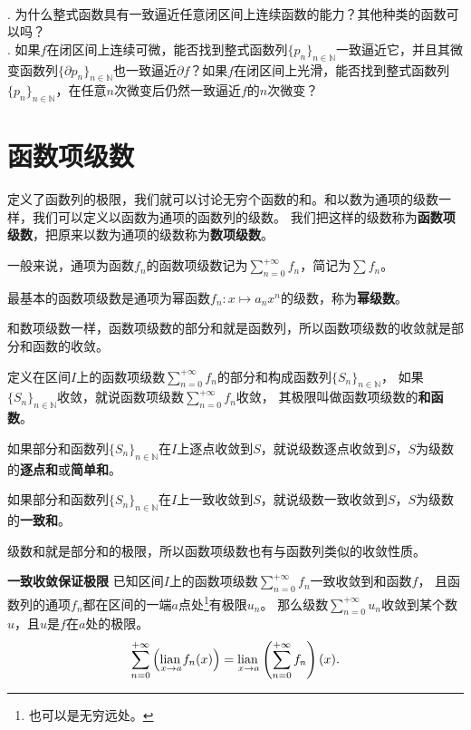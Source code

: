 \documentclass[12pt,UTF8]{ctexbook}
\begin{document}
\begin{sk}
    \mbox{} \\
    . 为什么整式函数具有一致逼近任意闭区间上连续函数的能力？其他种类的函数可以吗？\\
    . 如果$f$在闭区间上连续可微，能否找到整式函数列$\{p_n\}_{n\in\mathbb{N}}$一致逼近它，并且其微变函数列$\{\partial p_n\}_{n\in\mathbb{N}}$也一致逼近$\partial f$？如果$f$在闭区间上光滑，能否找到整式函数列$\{p_n\}_{n\in\mathbb{N}}$，在任意$n$次微变后仍然一致逼近$f$的$n$次微变？
\end{sk}

\section{函数项级数}

定义了函数列的极限，我们就可以讨论无穷个函数的和。和以数为通项的级数一样，我们可以定义以函数为通项的函数列的级数。
我们把这样的级数称为\textbf{函数项级数}，把原来以数为通项的级数称为\textbf{数项级数}。

一般来说，通项为函数$f_n$的函数项级数记为$\sum_{n=0}^{+\infty} f_n$，简记为$\sum f_n$。

最基本的函数项级数是通项为幂函数$f_n: x\mapsto a_n x^n$的级数，称为\textbf{幂级数}。

和数项级数一样，函数项级数的部分和就是函数列，所以函数项级数的收敛就是部分和函数的收敛。

定义在区间$I$上的函数项级数$\sum_{n=0}^{+\infty} f_n$的部分和构成函数列$\{S_n\}_{n\in\mathbb{N}}$，
如果$\{S_n\}_{n\in\mathbb{N}}$收敛，就说函数项级数$\sum_{n=0}^{+\infty} f_n$收敛，
其极限叫做函数项级数的\textbf{和函数}。

如果部分和函数列$\{S_n\}_{n\in\mathbb{N}}$在$I$上逐点收敛到$S$，就说级数逐点收敛到$S$，$S$为级数的\textbf{逐点和}或\textbf{简单和}。

如果部分和函数列$\{S_n\}_{n\in\mathbb{N}}$在$I$上一致收敛到$S$，就说级数一致收敛到$S$，$S$为级数的\textbf{一致和}。

级数和就是部分和的极限，所以函数项级数也有与函数列类似的收敛性质。

\begin{tm}{\textbf{一致收敛保证极限}}
    已知区间$I$上的函数项级数$\sum_{n=0}^{+\infty} f_n$一致收敛到和函数$f$，
    且函数列的通项$f_n$都在区间的一端$a$点处\footnote{也可以是无穷远处。}有极限$u_n$。
    那么级数$\sum_{n=0}^{+\infty} u_n$收敛到某个数$u$，且$u$是$f$在$a$处的极限。
    $$ \sum_{n=0}^{+\infty} \left(\underset{x\to a}{\operatorname{lian}\,} f_n(x) \right) = \underset{x\to a}{\operatorname{lian}\,} \left(\sum_{n=0}^{+\infty} f_n\right)(x). $$
\end{tm}
\end{document}
